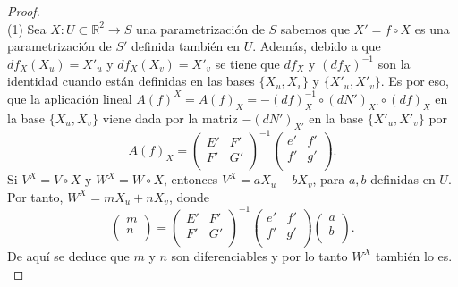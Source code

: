 \begin{proof}	
	${ }$\\
	
	(1)  Sea $X : U \subset \mathbb{R}^2 \to S$ una parametrización de $S$ sabemos que $X' = f \circ X$ es una parametrización de $S'$ definida también en $U$. Además, debido a que $df_X(X_u) = X'_{u}$ y $df_X(X_v) = X'_{v}$ se tiene que $df_X$ y $(df_X)^{-1}$ son la identidad cuando están definidas en las bases $\{X_u, X_v \}$ y $\{X'_{u}, X'_{v} \}$. Es por eso, que la aplicación lineal $A(f)^X = A(f)_X = -(df)^{-1}_{X} \circ (dN')_{X'} \circ (df)_X$ en la base $\{X_u, X_v \}$ viene dada por la matriz $-(dN')_{X'}$ en la base $\{X'_{u}, X'_{v} \}$ por
	${ }$\\
	\[
		A(f)_X = \left( {\begin{array}{cc}
			E' & F' \\
			F' & G' \\
			\end{array} } \right)^{-1}
		\left( {\begin{array}{cc}
			e' & f' \\
			f' & g' \\
			\end{array} } \right).
	\]
	${ }$\\
	
	Si $V^X = V \circ X$ y $W^X = W \circ X$, entonces $V^X = aX_u + bX_v$, para $a,b$ definidas en $U$. Por tanto, $W^X = mX_u + nX_v$, donde
	${ }$\\
	\[
		\left( {\begin{array}{c}
			m \\
			n \\
			\end{array} } \right)
		=
		\left( {\begin{array}{cc}
			E' & F' \\
			F' & G' \\
			\end{array} } \right)^{-1}
		\left( {\begin{array}{cc}
			e' & f' \\
			f' & g' \\
			\end{array} } \right)
		\left( {\begin{array}{c}
			a \\
			b \\
			\end{array} } \right).
	\]
	${ }$\\
	De aquí se deduce que $m$ y $n$ son diferenciables y por lo tanto $W^X$ también lo es.
	${ }$\\
	

\end{proof}
